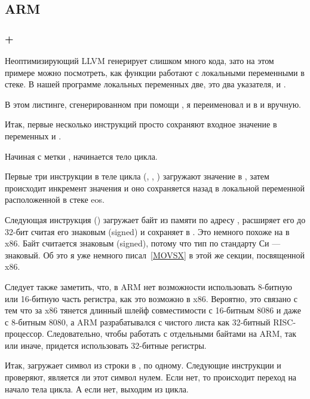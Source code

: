 ﻿\subsection{ARM}

\subsubsection{\NonOptimizingXcode + \ARMMode}



Неоптимизирующий LLVM генерирует слишком много кода, зато на этом примере можно посмотреть, как функции работают
с локальными переменными в стеке. В нашей программе локальных переменных две, это два указателя,  и .

В этом листинге, сгенерированном при помощи \IDA, я переименовал  и  в  и  вручную.

Итак, первые несколько инструкций просто сохраняют входное значение в переменных  и .

Начиная с метки , начинается тело цикла.

Первые три инструкции в теле цикла (, \ADD, ) загружают значение  в \Rzero, 
затем происходит инкремент значения и оно
сохраняется назад в локальной переменной расположенной в стеке eos.

Следующая инструкция  () загружает байт из памяти по адресу \Rzero,
расширяет его до 32-бит считая его знаковым (signed) и сохраняет в \Rzero. Это немного похоже на \MOVSX в x86.
Байт считается знаковым (signed), потому что тип \Tchar по стандарту Си --- знаковый.
Об это я уже немного писал~\ref{MOVSX} в этой же секции, посвященной x86.

Следует также заметить, что, в ARM нет возможности использовать 8-битную или 16-битную часть регистра, как это возможно
в x86. 
Вероятно, это связано с тем что за x86 тянется длинный шлейф совместимости с 16-битным 8086 и даже с 8-битным 8080, а ARM
разрабатывался с чистого листа как 32-битный RISC-процессор. 
Следовательно, чтобы работать с отдельными байтами на ARM, так или иначе, придется использовать 32-битные регистры.

Итак,  загружает символ из строки в \Rzero, по одному. 
Следующие инструкции \CMP и  проверяют, является ли этот символ нулем.
Если нет, то происходит переход на начало тела цикла. А если нет, выходим из цикла.

